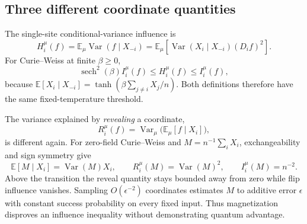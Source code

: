 \subsection{Three different coordinate quantities}

The single-site conditional-variance influence is
\[
 H_i^\mu(f)=\mathbb E_\mu\operatorname{Var}(f\mid X_{-i})
 =\mathbb E_\mu\left[\operatorname{Var}(X_i\mid X_{-i})(D_if)^2\right].
\]
For Curie--Weiss at finite $\beta\ge0$,
\[
 \operatorname{sech}^2(\beta)I_i^\mu(f)
 \le H_i^\mu(f)\le I_i^\mu(f),
\]
because $\mathbb E[X_i\mid X_{-i}]=\tanh(\beta\sum_{j\ne i}X_j/n)$. Both definitions therefore have the same fixed-temperature threshold.

The variance explained by \emph{revealing} a coordinate,
\[
 R_i^\mu(f)=\operatorname{Var}_\mu\bigl(\mathbb E_\mu[f\mid X_i]\bigr),
\]
is different again. For zero-field Curie--Weiss and $M=n^{-1}\sum_iX_i$, exchangeability and sign symmetry give
\[
 \mathbb E[M\mid X_i]=\operatorname{Var}(M)X_i,
 \qquad R_i^\mu(M)=\operatorname{Var}(M)^2,
 \qquad I_i^\mu(M)=n^{-2}.
\]
Above the transition the reveal quantity stays bounded away from zero while flip influence vanishes. Sampling $O(\epsilon^{-2})$ coordinates estimates $M$ to additive error $\epsilon$ with constant success probability on every fixed input. Thus magnetization disproves an influence inequality without demonstrating quantum advantage.
